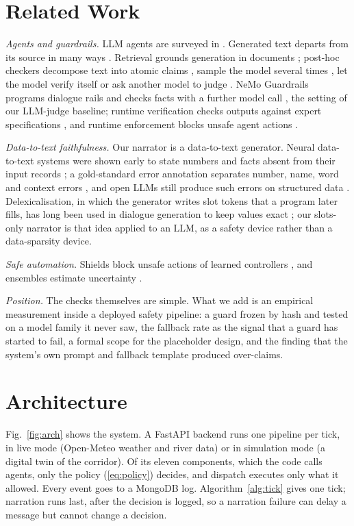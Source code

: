 \documentclass[conference]{IEEEtran}
\begin{document}
\section{Related Work}
\textit{Agents and guardrails.} LLM agents are surveyed in \cite{WangL2024}. Generated text departs from its source in many ways \cite{Ji2023}. Retrieval grounds generation in documents \cite{Lewis2020}; post-hoc checkers decompose text into atomic claims \cite{Min2023}, sample the model several times \cite{Manakul2023}, let the model verify itself \cite{Dhuliawala2024} or ask another model to judge \cite{Zheng2023}. NeMo Guardrails programs dialogue rails and checks facts with a further model call \cite{Rebedea2023}, the setting of our LLM-judge baseline; runtime verification checks outputs against expert specifications \cite{Zhang2025}, and runtime enforcement blocks unsafe agent actions \cite{WangH2026}.

\textit{Data-to-text faithfulness.} Our narrator is a data-to-text generator. Neural data-to-text systems were shown early to state numbers and facts absent from their input records \cite{Wiseman2017}; a gold-standard error annotation separates number, name, word and context errors \cite{Thomson2020}, and open LLMs still produce such errors on structured data \cite{Kasner2024}. Delexicalisation, in which the generator writes slot tokens that a program later fills, has long been used in dialogue generation to keep values exact \cite{Wen2015}; our slots-only narrator is that idea applied to an LLM, as a safety device rather than a data-sparsity device.

\textit{Safe automation.} Shields block unsafe actions of learned controllers \cite{Alshiekh2018}, and ensembles estimate uncertainty \cite{Lakshminarayanan2017}.

\textit{Position.} The checks themselves are simple. What we add is an empirical measurement inside a deployed safety pipeline: a guard frozen by hash and tested on a model family it never saw, the fallback rate as the signal that a guard has started to fail, a formal scope for the placeholder design, and the finding that the system's own prompt and fallback template produced over-claims.

\section{Architecture}
\label{sec:arch}
Fig.~\ref{fig:arch} shows the system. A FastAPI backend runs one pipeline per tick, in live mode (Open-Meteo weather and river data) or in simulation mode (a digital twin of the corridor). Of its eleven components, which the code calls agents, only the policy (\ref{eq:policy}) decides, and dispatch executes only what it allowed. Every event goes to a MongoDB log. Algorithm~\ref{alg:tick} gives one tick; narration runs last, after the decision is logged, so a narration failure can delay a message but cannot change a decision.
\end{document}
